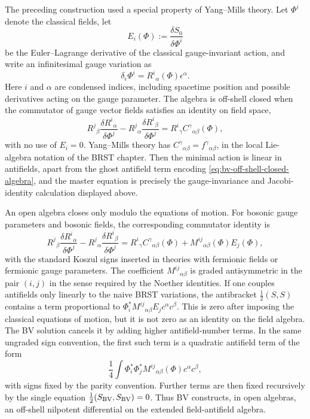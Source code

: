 \begin{remark}
The preceding construction used a special property of Yang--Mills theory.  Let
\(\Phi^i\) denote the classical fields, let
\[
  E_i(\Phi):=\frac{\delta S_0}{\delta\Phi^i}
\]
be the Euler--Lagrange derivative of the classical gauge-invariant action, and
write an infinitesimal gauge variation as
\[
  \delta_\epsilon\Phi^i=R^i{}_\alpha(\Phi)\epsilon^\alpha .
\]
Here \(i\) and \(\alpha\) are condensed indices, including spacetime position
and possible derivatives acting on the gauge parameter.  The algebra is
off-shell closed when the commutator of gauge vector fields satisfies an
identity on field space,
\begin{equation}
  R^j{}_\beta\frac{\delta R^i{}_\alpha}{\delta\Phi^j}
  -
  R^j{}_\alpha\frac{\delta R^i{}_\beta}{\delta\Phi^j}
  =
  R^i{}_\gamma C^\gamma{}_{\alpha\beta}(\Phi),
  \label{eq:bv-off-shell-closed-algebra}
\end{equation}
with no use of \(E_i=0\).  Yang--Mills theory has
\(C^\gamma{}_{\alpha\beta}=f^\gamma{}_{\alpha\beta}\), in the local
Lie-algebra notation of the BRST chapter.  Then the minimal action is linear
in antifields, apart from the ghost antifield term encoding
\eqref{eq:bv-off-shell-closed-algebra}, and the master equation is precisely
the gauge-invariance and Jacobi-identity calculation displayed above.

An open algebra closes only modulo the equations of motion.  For bosonic
gauge parameters and bosonic fields, the corresponding commutator identity is
\begin{equation}
  R^j{}_\beta\frac{\delta R^i{}_\alpha}{\delta\Phi^j}
  -
  R^j{}_\alpha\frac{\delta R^i{}_\beta}{\delta\Phi^j}
  =
  R^i{}_\gamma C^\gamma{}_{\alpha\beta}(\Phi)
  +
  M^{ij}{}_{\alpha\beta}(\Phi)E_j(\Phi),
  \label{eq:bv-open-algebra}
\end{equation}
with the standard Koszul signs inserted in theories with fermionic fields or
fermionic gauge parameters.  The coefficient
\(M^{ij}{}_{\alpha\beta}\) is graded antisymmetric in the pair
\((i,j)\) in the sense required by the Noether identities.  If one couples
antifields only linearly to the naive BRST variations, the antibracket
\(\frac12(S,S)\) contains a term proportional to
\(\Phi^*_i M^{ij}{}_{\alpha\beta}E_j c^\alpha c^\beta\).  This is zero after
imposing the classical equations of motion, but it is not zero as an identity
on the field algebra.  The BV solution cancels it by adding higher
antifield-number terms.  In the same ungraded sign convention, the first such
term is a quadratic antifield term of the form
\[
  \frac14\int \Phi^*_i\Phi^*_j
  M^{ij}{}_{\alpha\beta}(\Phi)c^\alpha c^\beta ,
\]
with signs fixed by the parity convention.  Further terms are then fixed
recursively by the single equation
\(\frac12(S_{\rm BV},S_{\rm BV})=0\).  Thus BV constructs, in open algebras,
an off-shell
nilpotent differential on the extended field-antifield algebra.


\end{remark}
